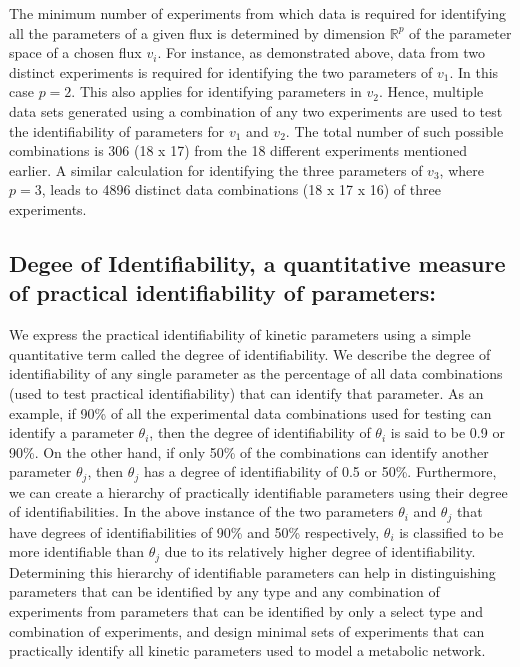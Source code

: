\documentclass[10pt]{article}
\begin{document}
The minimum number of experiments from which data is required for identifying all the parameters of a given flux is determined by dimension $\mathbb{R}^p$ of the parameter space of a chosen flux $v_i$. For instance, as demonstrated above, data from two distinct experiments is required for identifying the two parameters of $v_1$. In this case $p=2$. This also applies for identifying parameters in $v_2$. Hence, multiple data sets generated using a combination of any two experiments are used to test the identifiability of parameters for $v_1$ and $v_2$. The total number of such possible combinations is 306 (18 x 17) from the 18 different experiments mentioned earlier. A similar calculation for identifying the three parameters of $v_3$, where $p=3$, leads to 4896 distinct data combinations (18 x 17 x 16) of three experiments. 

\subsection{Degee of Identifiability, a quantitative measure of practical identifiability of parameters:}\label{sec:degree_of_identifiability}
We express the practical identifiability of kinetic parameters using a simple quantitative term called the degree of identifiability. We describe the degree of identifiability of any single parameter as the percentage of all data combinations (used to test practical identifiability) that can identify that parameter. As an example, if 90\% of all the experimental data combinations used for testing can identify a parameter $\theta_i$, then the degree of identifiability of $\theta_i$ is said to be 0.9 or 90\%. On the other hand, if only 50\% of the combinations can identify another parameter $\theta_j$, then $\theta_j$ has a degree of identifiability of 0.5 or 50\%. Furthermore, we can create a hierarchy of practically identifiable parameters using their degree of identifiabilities. In the above instance of the two parameters $\theta_i$ and $\theta_j$ that have degrees of identifiabilities of 90\% and 50\% respectively, $\theta_i$ is classified to be more identifiable than $\theta_j$ due to its relatively higher degree of identifiability. Determining this hierarchy of identifiable parameters can help in distinguishing parameters that can be identified by any type and any combination of experiments from parameters that can be identified by only a select type and combination of experiments, and design minimal sets of experiments that can practically identify all kinetic parameters used to model a metabolic network.  
\end{document}
